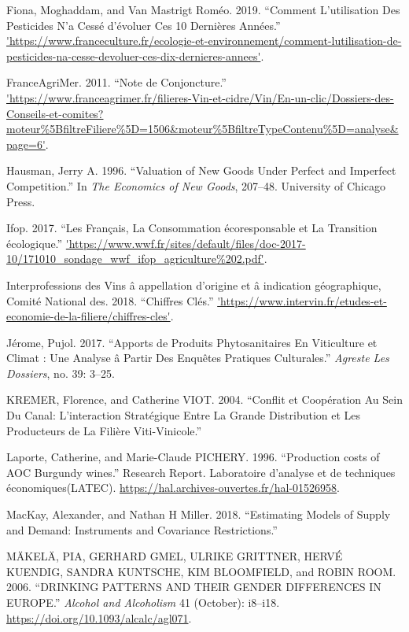 \documentclass[11pt,]{article}
\begin{document}
\leavevmode\hypertarget{ref-Moghaddam2019}{}%
Fiona, Moghaddam, and Van Mastrigt Roméo. 2019. ``Comment L'utilisation
Des Pesticides N'a Cessé d'évoluer Ces 10 Dernières Années.''
\url{'https://www.franceculture.fr/ecologie-et-environnement/comment-lutilisation-de-pesticides-na-cesse-devoluer-ces-dix-dernieres-annees'}.

\leavevmode\hypertarget{ref-FranceAgriMer2011}{}%
FranceAgriMer. 2011. ``Note de Conjoncture.''
\url{'https://www.franceagrimer.fr/filieres-Vin-et-cidre/Vin/En-un-clic/Dossiers-des-Conseils-et-comites?moteur\%5BfiltreFiliere\%5D=1506\&moteur\%5BfiltreTypeContenu\%5D=analyse\&page=6'}.

\leavevmode\hypertarget{ref-hausman1996valuation}{}%
Hausman, Jerry A. 1996. ``Valuation of New Goods Under Perfect and
Imperfect Competition.'' In \emph{The Economics of New Goods}, 207--48.
University of Chicago Press.

\leavevmode\hypertarget{ref-Ifop2017}{}%
Ifop. 2017. ``Les Français, La Consommation écoresponsable et La
Transition écologique.''
\url{'https://www.wwf.fr/sites/default/files/doc-2017-10/171010_sondage_wwf_ifop_agriculture\%202.pdf'}.

\leavevmode\hypertarget{ref-CNIV2018}{}%
Interprofessions des Vins â appellation d'origine et â indication
géographique, Comité National des. 2018. ``Chiffres Clés.''
\url{'https://www.intervin.fr/etudes-et-economie-de-la-filiere/chiffres-cles'}.

\leavevmode\hypertarget{ref-Pujol2017}{}%
Jérome, Pujol. 2017. ``Apports de Produits Phytosanitaires En
Viticulture et Climat : Une Analyse â Partir Des Enquêtes Pratiques
Culturales.'' \emph{Agreste Les Dossiers}, no. 39: 3--25.

\leavevmode\hypertarget{ref-kremer2004}{}%
KREMER, Florence, and Catherine VIOT. 2004. ``Conflit et Coopération Au
Sein Du Canal: L'interaction Stratégique Entre La Grande Distribution et
Les Producteurs de La Filière Viti-Vinicole.''

\leavevmode\hypertarget{ref-laporte1996}{}%
Laporte, Catherine, and Marie-Claude PICHERY. 1996. ``Production costs
of AOC Burgundy wines.'' Research Report. Laboratoire d'analyse et de
techniques économiques(LATEC).
\url{https://hal.archives-ouvertes.fr/hal-01526958}.

\leavevmode\hypertarget{ref-mackay2018}{}%
MacKay, Alexander, and Nathan H Miller. 2018. ``Estimating Models of
Supply and Demand: Instruments and Covariance Restrictions.''

\leavevmode\hypertarget{ref-makela2006}{}%
MÄKELÄ, PIA, GERHARD GMEL, ULRIKE GRITTNER, HERVÉ KUENDIG, SANDRA
KUNTSCHE, KIM BLOOMFIELD, and ROBIN ROOM. 2006. ``DRINKING PATTERNS AND
THEIR GENDER DIFFERENCES IN EUROPE.'' \emph{Alcohol and Alcoholism} 41
(October): i8--i18. \url{https://doi.org/10.1093/alcalc/agl071}.
\end{document}
